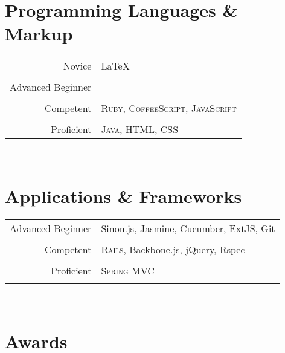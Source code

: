 \documentclass[10pt]{article} %
\begin{document}
{\begin{minipage}[t]{0.5\textwidth}

\section{Programming Languages \& Markup} 

\begin{tabular}{rl}
Novice
& \textsc{} \LaTeX \\ 
\\
Advanced Beginner
& \textsc{}\\
\\
Competent
& \textsc{Ruby, CoffeeScript, JavaScript} \\
\\
Proficient
& \textsc{Java, HTML, CSS} \\
\end{tabular}\\[10pt]


\section{Applications \& Frameworks} 

\begin{tabular}{rl}
Advanced Beginner
& Sinon.js, Jasmine, Cucumber, ExtJS, Git\\
\\
Competent
& \textsc{Rails}, Backbone.js, jQuery, Rspec \\
\\
Proficient
& \textsc{Spring MVC} \\
\\
\end{tabular}\\[10pt]



\section{Awards} 


\end{minipage}}
\end{document}
